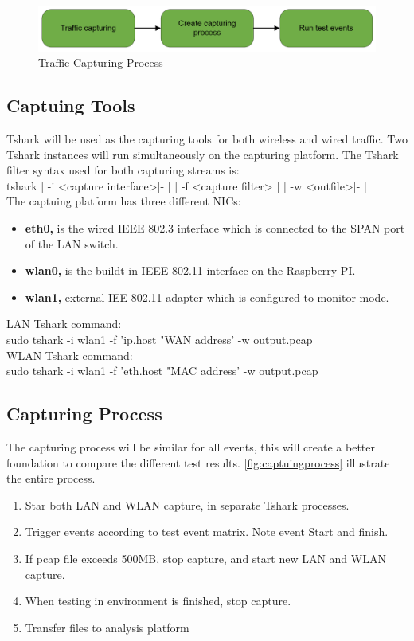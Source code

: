 \begin{figure}[H]
    \centering
    \includegraphics[width=\textwidth]{figures/TrafficCapturingProcess.png}
    \caption{Traffic Capturing Process}
    \label{fig:TrafficCapturingProcess}
\end{figure}

\subsection{Captuing Tools}
Tshark will be used as the capturing tools for both wireless and wired traffic. Two Tshark instances will run simultaneously on the capturing platform. The Tshark filter syntax used for both capturing streams is: 
\\
tshark [ -i <capture interface>|- ] [ -f <capture filter> ] [ -w <outfile>|- ]
\\
The captuing platform has three different NICs:
\begin{itemize}
    \item \textbf{eth0,} is the wired IEEE 802.3 interface which is connected to the SPAN port of the LAN switch.
    \item \textbf{wlan0,} is the buildt in IEEE 802.11 interface on the Raspberry PI.
    \item  \textbf{wlan1,} external IEE 802.11 adapter which is configured to monitor mode.
\end{itemize}

LAN Tshark command:
\\
sudo tshark -i wlan1 -f 'ip.host "WAN address' -w output.pcap
\\
WLAN Tshark command:
\\
sudo tshark -i wlan1 -f 'eth.host "MAC address' -w output.pcap
\\

\subsection{Capturing Process}
The capturing process will be similar for all events, this will create a better foundation to compare the different test results. \ref{fig:captuingprocess} illustrate the entire process.
\begin{enumerate}
    \item Star both LAN and WLAN capture, in separate Tshark processes.
    \item Trigger events according to test event matrix. Note event Start and finish. 
    \item If pcap file exceeds 500MB, stop capture, and start new LAN and WLAN capture.
    \item When testing in environment is finished, stop capture. 
    \item Transfer files to analysis platform
\end{enumerate}
   

